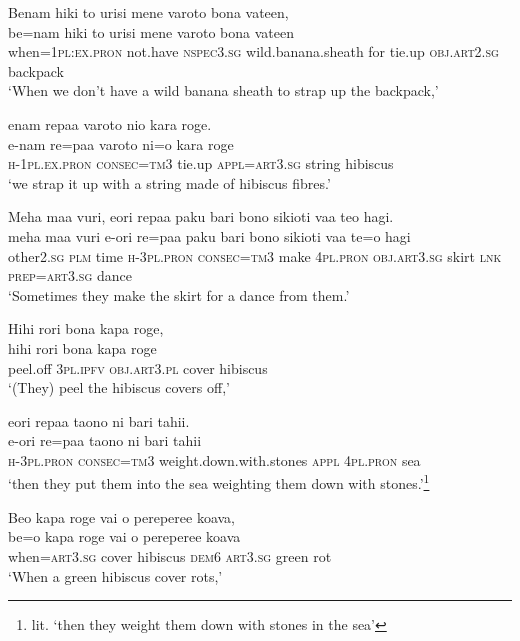 \ea\label{ex:text8-7}
Benam hiki to urisi mene varoto bona vateen,\\
\gll be=nam	hiki	to	urisi	mene	varoto	bona	vateen\\
     when=1\textsc{pl}:\textsc{ex}.\textsc{pron}	not.have	\textsc{nspec}3.\textsc{sg}	wild.banana.sheath	for	tie.up	\textsc{obj}.\textsc{art}2.\textsc{sg}	backpack\\
\glt `When we don't have a wild banana sheath to strap up the backpack,'
\z

\ea\label{ex:text8-8}
enam repaa varoto nio kara roge.\\
\gll e-nam	re=paa	varoto	ni=o	kara roge\\
     \textsc{h}-1\textsc{pl}.\textsc{ex}.\textsc{pron}	\textsc{consec}=\textsc{tm}3	tie.up	\textsc{appl}=\textsc{art}3.\textsc{sg}	string	hibiscus\\
\glt `we strap it up with a string made of hibiscus fibres.'
\z

\ea\label{ex:text8-9}
Meha maa vuri, eori repaa paku bari bono sikioti vaa teo hagi.\\
\gll meha	maa	vuri	e-ori	re=paa	paku	bari	bono	sikioti	vaa	te=o	hagi\\
     other2.\textsc{sg}	\textsc{plm}	time	\textsc{h}-3\textsc{pl}.\textsc{pron}	\textsc{consec}=\textsc{tm}3	make	4\textsc{pl}.\textsc{pron}	\textsc{obj}.\textsc{art}3.\textsc{sg}	skirt	\textsc{lnk}	\textsc{prep}=\textsc{art}3.\textsc{sg}	dance\\
\glt `Sometimes they make the skirt for a dance from them.'
\z

\ea\label{ex:text8-10}
Hihi rori bona kapa roge,\\
\gll hihi	rori	bona	kapa	roge\\
     peel.off	3\textsc{pl}.\textsc{ipfv}	\textsc{obj}.\textsc{art}3.\textsc{pl}	cover	hibiscus\\
\glt `(They) peel the hibiscus covers off,'
\z

\ea\label{ex:text8-11}
eori repaa taono ni bari tahii.\\
\gll e-ori	re=paa	taono	ni	bari	tahii\\
     \textsc{h}-3\textsc{pl}.\textsc{pron}	\textsc{consec}=\textsc{tm}3	weight.down.with.stones	\textsc{appl}	4\textsc{pl}.\textsc{pron}	sea\\
\glt `then they put them into the sea weighting them down with stones.'\footnote{lit. `then they weight them down with stones in the sea'}
\z

\ea\label{ex:text8-12}
Beo kapa roge vai o pereperee koava,\\
\gll be=o	kapa	roge	vai	o	pereperee	koava\\
     when=\textsc{art}3.\textsc{sg}	cover	hibiscus	\textsc{dem}6	\textsc{art}3.\textsc{sg}	green	rot\\
\glt `When a green hibiscus cover rots,'
\z

